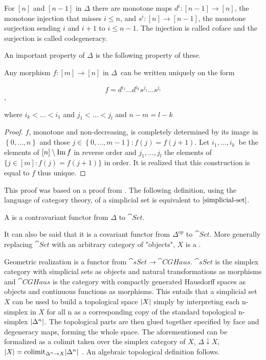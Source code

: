 \documentclass[../../main.tex]{subfiles}
\begin{document}
    For $[n]$ and $[n-1]$ in $\Delta$ there are monotone maps $d^i: [n-1] \to [n]$, the monotone injection that misses $i \leq n$, and $s^i: [n] \to [n-1]$, the monotone surjection sending $i$ and $i+1$ to $i \leq n-1$. The injection is called coface and the surjection is called codegeneracy. 


    An important property of $\Delta$ is the following property of these.

    \begin{proposition}\label{uni-sim}
        Any morphism $f: [m] \to [n]$ in $\Delta$ can be written uniquely on the form

        \begin{equation*}
            f = d^{i_1}...d^{i_k}s^{j_1}...s^{j_l}
        \end{equation*},

        where $i_k < ... < i_1$ and $j_1 < ... < j_l$ and $n - m = l - k$
    \end{proposition}

    \begin{proof}
        $f$, monotone and non-decreasing, is completely determined by its image in $\left\{ 0,...,n \right\}$ and those $j\in \left\{0,...,m-1 \right\}:f(j) = f(j+1)$. Let $i_1, ..., i_k$ be the elements of $[n] \setminus \Ima f$ in reverse order and $j_1, ..., j_l$ the elements of $\{j \in [m]: f(j) = f(j+1)\}$ in order. It is realized that this construction is equal to $f$ thus unique.
    \end{proof}

    This proof was based on a proof from \cite{simp-maye}. The following definition, using the language of category theory, of a simplicial set is equivalent to $\ref{simplicial-set}$.

    \begin{definition}
        A  is a contravariant functor from $\Delta$ to $\cat{Set}$.
    \end{definition}

    It can also be said that it is a covariant functor from $\Delta^{op}$ to $\cat{Set}$. More generally replacing $\cat{Set}$ with an arbitrary category of "objects", $X$ is a .
    
    Geometric realization is a functor from $\cat{sSet}\to \cat{CGHaus}$. $\cat{sSet}$ is the simplex category with simplicial sets as objects and natural transformations as morphisms and $\cat{CGHaus}$ is the category with compactly generated Hausdorff spaces as objects and continuous functions as morphisms. This entails that a simplicial set $X$ can be used to build a topological space $\geom[X]$ simply by interpreting each n-simplex in $X$ for all n as a corresponding copy of the standard topological n-simplex $\geom[\Delta^n]$. The topological parts are then glued together specified by face and degeneracy maps, forming the whole space. The aforementioned can be formalized as a colimit taken over the simplex category of $X$, $\Delta \downarrow X$, $\geom[X]= \text{colimit}_{\Delta^n\to X}\geom[\Delta^n]$ \cite{luk-simp}. An algebraic topological definition follows.
\end{document}
